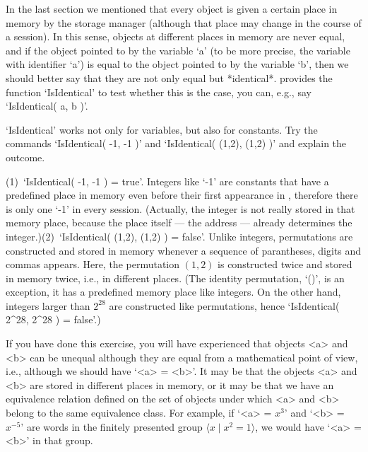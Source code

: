 \null

%
In the last section  we mentioned that every object   is given a  certain
place  in memory by the  {\GAP} storage manager  (although that place may
change in the course  of  a {\GAP}  session). In  this sense, objects  at
different places in memory are never equal, and if  the object pointed to
by the  variable  `a' (to be more  precise,  the variable with identifier
`a')  is  equal to the   object pointed to by  the  variable `b', then we
should better  say that they  are not only  equal but *identical*. {\GAP}
provides the function `IsIdentical' to test whether this is the case, you
can, e.g., say `IsIdentical( a, b )'.

\exercise  `IsIdentical'   works not only  for   variables,  but also for
constants. Try  the commands  `IsIdentical(  -1, -1 )'  and `IsIdentical(
(1,2), (1,2) )' and explain the outcome.

\answer  (1)~`IsIdentical( -1,  -1  )  =  true'.  Integers  like `-1' are
constants that have a predefined place in memory  even before their first
appearance  in {\GAP}, therefore there  is only one  `-1' in every {\GAP}
session.  (Actually,   the integer is  not  really stored in  that memory
place, because  the place itself --- the  address ---  already determines
the  integer.)\quad(2)~`IsIdentical(  (1,2),  (1,2) )   =  false'. Unlike
integers, permutations are constructed and   stored in memory whenever  a
sequence of    parantheses,    digits and  commas   appears.   Here,  the
permutation $(1,2)$  is constructed  twice  and stored  in  memory twice,
i.e.,  in different   places.  (The  identity  permutation,  `()', is  an
exception, it has a  predefined memory place like  integers. On the other
hand,  integers larger than  $2^{28}$  are constructed like permutations,
hence `IsIdentical( 2^28, 2^28 ) = false'.)

If  you have done this  exercise, you  will  have experienced that {\GAP}
objects  <a>  and  <b> can  be  unequal  although they are   equal from a
mathematical point of view, i.e., although we should have `<a> = <b>'. It
may  be that the objects <a>  and <b> are  stored  in different places in
memory, or it may be that we have  an equivalence relation defined on the
set of  objects under which <a>  and <b> belong   to the same equivalence
class.  For example, if `<a>  = $x^3$' and  `<b> = $x^{-5}$' are words in
the finitely presented group $\langle  x\mid x^2=1\rangle$, we would have
`<a> = <b>' in that group.

